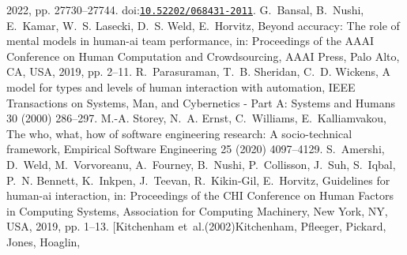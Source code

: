 \documentclass[10pt,a4paper]{article}
\providecommand{\bibinfo}[2]{#2}
\providecommand{\DOIprefix}{doi:}
\providecommand{\doi}[1]{\href{https://doi.org/#1}{\nolinkurl{#1}}}
\begin{document}
\begin{thebibliography}{25}
  \bibinfo{year}{2022}, pp. \bibinfo{pages}{27730--27744}.
  \DOIprefix\doi{10.52202/068431-2011}.
\bibinfo{author}{G.~Bansal}, \bibinfo{author}{B.~Nushi},
  \bibinfo{author}{E.~Kamar}, \bibinfo{author}{W.~S. Lasecki},
  \bibinfo{author}{D.~S. Weld}, \bibinfo{author}{E.~Horvitz},
\newblock \bibinfo{title}{Beyond accuracy: The role of mental models in
  human-ai team performance},
\newblock in: \bibinfo{booktitle}{Proceedings of the AAAI Conference on Human
  Computation and Crowdsourcing}, \bibinfo{publisher}{AAAI Press},
  \bibinfo{address}{Palo Alto, CA, USA}, \bibinfo{year}{2019}, pp.
  \bibinfo{pages}{2--11}.
\bibinfo{author}{R.~Parasuraman}, \bibinfo{author}{T.~B. Sheridan},
  \bibinfo{author}{C.~D. Wickens},
\newblock \bibinfo{title}{A model for types and levels of human interaction
  with automation},
\newblock \bibinfo{journal}{IEEE Transactions on Systems, Man, and Cybernetics
  - Part A: Systems and Humans} \bibinfo{volume}{30} (\bibinfo{year}{2000})
  \bibinfo{pages}{286--297}.
\bibinfo{author}{M.-A. Storey}, \bibinfo{author}{N.~A. Ernst},
  \bibinfo{author}{C.~Williams}, \bibinfo{author}{E.~Kalliamvakou},
\newblock \bibinfo{title}{The who, what, how of software engineering research:
  A socio-technical framework},
\newblock \bibinfo{journal}{Empirical Software Engineering}
  \bibinfo{volume}{25} (\bibinfo{year}{2020}) \bibinfo{pages}{4097--4129}.
\bibinfo{author}{S.~Amershi}, \bibinfo{author}{D.~Weld},
  \bibinfo{author}{M.~Vorvoreanu}, \bibinfo{author}{A.~Fourney},
  \bibinfo{author}{B.~Nushi}, \bibinfo{author}{P.~Collisson},
  \bibinfo{author}{J.~Suh}, \bibinfo{author}{S.~Iqbal}, \bibinfo{author}{P.~N.
  Bennett}, \bibinfo{author}{K.~Inkpen}, \bibinfo{author}{J.~Teevan},
  \bibinfo{author}{R.~Kikin-Gil}, \bibinfo{author}{E.~Horvitz},
\newblock \bibinfo{title}{Guidelines for human-ai interaction},
\newblock in: \bibinfo{booktitle}{Proceedings of the CHI Conference on Human
  Factors in Computing Systems}, \bibinfo{publisher}{Association for Computing
  Machinery}, \bibinfo{address}{New York, NY, USA}, \bibinfo{year}{2019}, pp.
  \bibinfo{pages}{1--13}.
\bibitem[{Kitchenham et~al.(2002)Kitchenham, Pfleeger, Pickard, Jones, Hoaglin,
}
\end{thebibliography}
\end{document}
